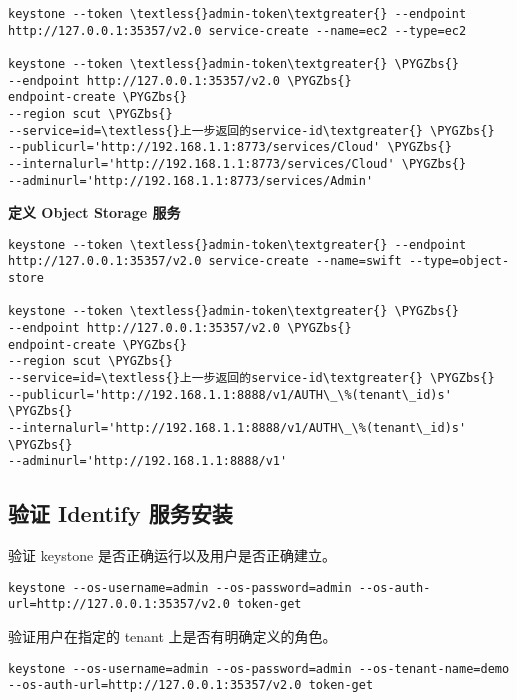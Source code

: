 \documentclass[letterpaper,10pt,english]{sphinxmanual}
\def\PYGZbs{\char`\\}
\begin{document}
\begin{Verbatim}[commandchars=\\\{\}]
keystone --token \textless{}admin-token\textgreater{} --endpoint http://127.0.0.1:35357/v2.0 service-create --name=ec2 --type=ec2

keystone --token \textless{}admin-token\textgreater{} \PYGZbs{}
--endpoint http://127.0.0.1:35357/v2.0 \PYGZbs{}
endpoint-create \PYGZbs{}
--region scut \PYGZbs{}
--service=id=\textless{}上一步返回的service-id\textgreater{} \PYGZbs{}
--publicurl='http://192.168.1.1:8773/services/Cloud' \PYGZbs{}
--internalurl='http://192.168.1.1:8773/services/Cloud' \PYGZbs{}
--adminurl='http://192.168.1.1:8773/services/Admin'
\end{Verbatim}

\textbf{定义 Object Storage 服务}

\begin{Verbatim}[commandchars=\\\{\}]
keystone --token \textless{}admin-token\textgreater{} --endpoint http://127.0.0.1:35357/v2.0 service-create --name=swift --type=object-store

keystone --token \textless{}admin-token\textgreater{} \PYGZbs{}
--endpoint http://127.0.0.1:35357/v2.0 \PYGZbs{}
endpoint-create \PYGZbs{}
--region scut \PYGZbs{}
--service=id=\textless{}上一步返回的service-id\textgreater{} \PYGZbs{}
--publicurl='http://192.168.1.1:8888/v1/AUTH\_\%(tenant\_id)s' \PYGZbs{}
--internalurl='http://192.168.1.1:8888/v1/AUTH\_\%(tenant\_id)s' \PYGZbs{}
--adminurl='http://192.168.1.1:8888/v1'
\end{Verbatim}


\subsection{验证 Identify 服务安装}
\label{keystone:identify}
验证 keystone 是否正确运行以及用户是否正确建立。

\begin{Verbatim}[commandchars=\\\{\}]
keystone --os-username=admin --os-password=admin --os-auth-url=http://127.0.0.1:35357/v2.0 token-get
\end{Verbatim}

验证用户在指定的 tenant 上是否有明确定义的角色。

\begin{Verbatim}[commandchars=\\\{\}]
keystone --os-username=admin --os-password=admin --os-tenant-name=demo --os-auth-url=http://127.0.0.1:35357/v2.0 token-get
\end{Verbatim}
\end{document}
